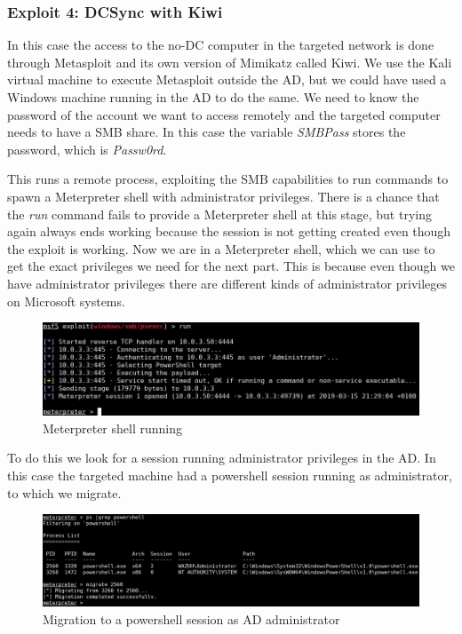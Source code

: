 \subsubsection{Exploit 4: DCSync with Kiwi}
In this case the access to the no-DC computer in the targeted network is done through Metasploit and its own version of Mimikatz called Kiwi\cite{pentestlab}. We use the Kali virtual machine to execute Metasploit outside the AD, but we could have used a Windows machine running in the AD to do the same.
\linej
We need to know the password of the account we want to access remotely and the targeted computer needs to have a SMB share.
In this case the variable \textit{SMBPass} stores the password, which is \textit{Passw0rd}.
\linej

\linej
This runs a remote process, exploiting the SMB capabilities to run commands to spawn a Meterpreter shell\cite{meterpreter} with administrator privileges. There is a chance that the \textit{run} command fails to provide a Meterpreter shell at this stage, but trying again always ends working because the session is not getting created even though the exploit is working.
\linej
\linej
Now we are in a Meterpreter shell, which we can use to get the exact privileges we need for the next part. This is because even though we have administrator privileges there are different kinds of administrator privileges on Microsoft systems.
\begin{figure}[H]
	\centering
	\includegraphics[width=\textwidth]{figuras/meterpreter.png}
	\caption{Meterpreter shell running}
\end{figure}

To do this we look for a session running administrator privileges in the AD. In this case the targeted machine had a powershell session running as administrator, to which we migrate.
\linej
\begin{figure}[H]
	\centering
	\includegraphics[width=\textwidth]{figuras/migrate.png}
	\caption{Migration to a powershell session as AD administrator}
\end{figure}

